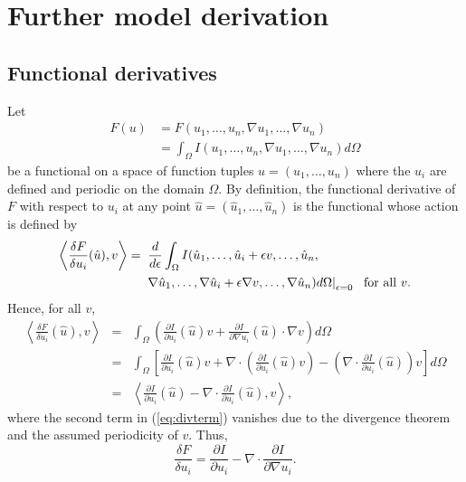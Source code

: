 \chapter{Further model derivation}
\label{sec:appendix}

\section{Functional derivatives}
\label{sec:fderiv}

Let
%
\begin{equation}
\begin{split}
  F(u) &=
     F( u_1, \ldots, u_n, \nabla u_1, \ldots, \nabla u_n )
     \\
     &= \int_{\Omega} I(u_1, \ldots, u_n, \nabla u_1, \ldots,
       \nabla u_n ) d\Omega
\end{split}
\end{equation}
%
be a functional on a space of function tuples $u = (u_1,\ldots,u_n)$
where the $u_i$ are defined and periodic on the domain
$\Omega$.  By definition, the functional derivative of $F$ with
respect to $u_i$ at any point $\hat{u} = (\hat{u}_1,\ldots,\hat{u}_n)$
is the functional whose action is defined by
%
\begin{equation}
\begin{split}
 \left < \frac{\delta F}{\delta u_i}(\hat{u}), v \right > = {} &
    \left . \frac{d}{d \epsilon} \int_{\Omega}
    I(\hat{u}_1, \ldots, \hat{u}_i + \epsilon
    v, \ldots, \hat{u}_n, \right .
    \\ &
    \left . \nabla \hat{u}_1, \ldots, \nabla \hat{u}_i + \epsilon
    \nabla v, \ldots, \nabla \hat{u}_n) d\Omega \right |_{\epsilon=0}
    ~~{\rm for~all~}v.
\end{split}
\end{equation}
%
Hence, for all $v$,
%
\begin{eqnarray}
  \left < \frac{\delta F}{\delta
      u_i}(\hat{u}), v \right >
  &=& \int_{\Omega} \left ( \frac{\partial I}{\partial u_i}(\hat{u})v + \frac{\partial
    I}{\partial \nabla u_i}(\hat{u}) \cdot \nabla v \right ) d\Omega
      \\
  &=& \int_{\Omega} \left [ \frac{\partial I}{\partial u_i}(\hat{u})v +
      \nabla \cdot \left ( \frac{\partial
    I}{\partial u_i}(\hat{u}) v \right ) 
  - \left ( \nabla \cdot \frac{\partial
    I}{\partial u_i}(\hat{u}) \right ) v
  \right ] d\Omega \label{eq:divterm} \\
  &=& \left < \frac{\partial I}{\partial u_i}(\hat{u})
  - \nabla \cdot \frac{\partial
    I}{\partial u_i}(\hat{u}) , v
  \right > ,
\end{eqnarray}
%
where the second term in (\ref{eq:divterm}) vanishes due to the
divergence theorem and the assumed periodicity of $v$.
Thus,
%
\begin{equation}
  \frac{\delta F}{\delta u_i} = \frac{\partial I}{\partial u_i}
  - \nabla \cdot \frac{\partial
    I}{\partial \nabla u_i} .  \label{funcderiv}
\end{equation}

